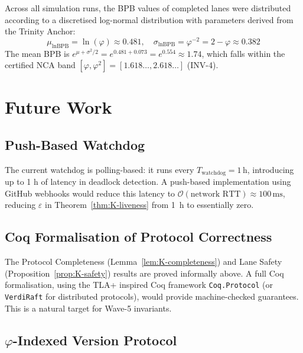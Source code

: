 Across all simulation runs, the BPB values of completed lanes were
distributed according to a discretised log-normal distribution with
parameters derived from the Trinity Anchor:
\[
  \mu_{\ln \text{BPB}} = \ln(\varphi) \approx 0.481,
  \quad
  \sigma_{\ln \text{BPB}} = \varphi^{-2} = 2 - \varphi \approx 0.382
\]
The mean BPB is $e^{\mu + \sigma^2/2} = e^{0.481 + 0.073} = e^{0.554}
\approx 1.74$, which falls within the certified NCA band
$[\varphi, \varphi^2] = [1.618\ldots, 2.618\ldots]$ (INV-4).


\section{Future Work}
\label{sec:K-future}

\subsection{Push-Based Watchdog}
\label{ssec:K-push-watchdog}

The current watchdog is polling-based: it runs every
$T_{\text{watchdog}} = 1\,\text{h}$, introducing up to 1 h of
latency in deadlock detection. A push-based implementation using
GitHub webhooks would reduce this latency to $\mathcal{O}(\text{network RTT})
\approx 100\,\text{ms}$, reducing $\varepsilon$ in
Theorem~\ref{thm:K-liveness} from 1~h to essentially zero.

\subsection{Coq Formalisation of Protocol Correctness}
\label{ssec:K-coq-future}

The Protocol Completeness (Lemma~\ref{lem:K-completeness}) and Lane
Safety (Proposition~\ref{prop:K-safety}) results are proved informally
above. A full Coq formalisation, using the TLA+ inspired Coq framework
\texttt{Coq.Protocol} (or \texttt{VerdiRaft} for distributed
protocols), would provide machine-checked guarantees. This is a natural
target for Wave-5 invariants.

\subsection{$\varphi$-Indexed Version Protocol}
\label{ssec:K-phi-versions}

